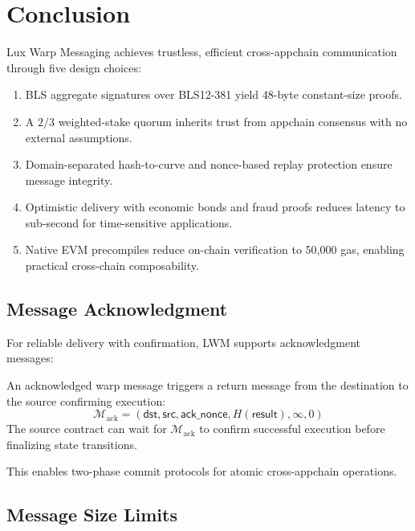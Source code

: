 \section{Conclusion}
\label{sec:conclusion}

Lux Warp Messaging achieves trustless, efficient cross-appchain communication through five design choices:

\begin{enumerate}
    \item BLS aggregate signatures over BLS12-381 yield 48-byte constant-size proofs.
    \item A $2/3$ weighted-stake quorum inherits trust from appchain consensus with no external assumptions.
    \item Domain-separated hash-to-curve and nonce-based replay protection ensure message integrity.
    \item Optimistic delivery with economic bonds and fraud proofs reduces latency to sub-second for time-sensitive applications.
    \item Native EVM precompiles reduce on-chain verification to 50,000 gas, enabling practical cross-chain composability.
\end{enumerate}

\subsection{Message Acknowledgment}

For reliable delivery with confirmation, LWM supports acknowledgment messages:

\begin{definition}
An acknowledged warp message triggers a return message from the destination to the source confirming execution:
\begin{equation}
    \mathcal{M}_{\text{ack}} = (\mathsf{dst}, \mathsf{src}, \mathsf{ack\_nonce}, H(\mathsf{result}), \infty, 0)
\end{equation}
The source contract can wait for $\mathcal{M}_{\text{ack}}$ to confirm successful execution before finalizing state transitions.
\end{definition}

This enables two-phase commit protocols for atomic cross-appchain operations.

\subsection{Message Size Limits}

